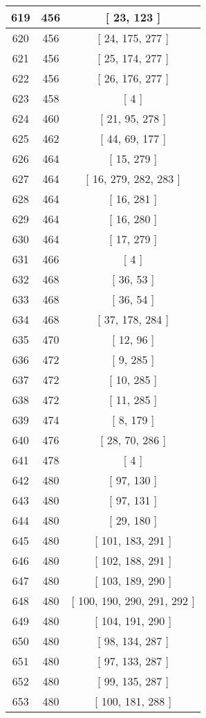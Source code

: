 \begin{center}
\begin{longtable}[H]{|| c c c ||}
619 & 456 & [ 23, 123 ]
\\\hline
620 & 456 & [ 24, 175, 277 ]
\\\hline
621 & 456 & [ 25, 174, 277 ]
\\\hline
622 & 456 & [ 26, 176, 277 ]
\\\hline
623 & 458 & [ 4 ]
\\\hline
624 & 460 & [ 21, 95, 278 ]
\\\hline
625 & 462 & [ 44, 69, 177 ]
\\\hline
626 & 464 & [ 15, 279 ]
\\\hline
627 & 464 & [ 16, 279, 282, 283 ]
\\\hline
628 & 464 & [ 16, 281 ]
\\\hline
629 & 464 & [ 16, 280 ]
\\\hline
630 & 464 & [ 17, 279 ]
\\\hline
631 & 466 & [ 4 ]
\\\hline
632 & 468 & [ 36, 53 ]
\\\hline
633 & 468 & [ 36, 54 ]
\\\hline
634 & 468 & [ 37, 178, 284 ]
\\\hline
635 & 470 & [ 12, 96 ]
\\\hline
636 & 472 & [ 9, 285 ]
\\\hline
637 & 472 & [ 10, 285 ]
\\\hline
638 & 472 & [ 11, 285 ]
\\\hline
639 & 474 & [ 8, 179 ]
\\\hline
640 & 476 & [ 28, 70, 286 ]
\\\hline
641 & 478 & [ 4 ]
\\\hline
642 & 480 & [ 97, 130 ]
\\\hline
643 & 480 & [ 97, 131 ]
\\\hline
644 & 480 & [ 29, 180 ]
\\\hline
645 & 480 & [ 101, 183, 291 ]
\\\hline
646 & 480 & [ 102, 188, 291 ]
\\\hline
647 & 480 & [ 103, 189, 290 ]
\\\hline
648 & 480 & [ 100, 190, 290, 291, 292 ]
\\\hline
649 & 480 & [ 104, 191, 290 ]
\\\hline
650 & 480 & [ 98, 134, 287 ]
\\\hline
651 & 480 & [ 97, 133, 287 ]
\\\hline
652 & 480 & [ 99, 135, 287 ]
\\\hline
653 & 480 & [ 100, 181, 288 ]
\\\hline

\end{longtable}
\end{center}
